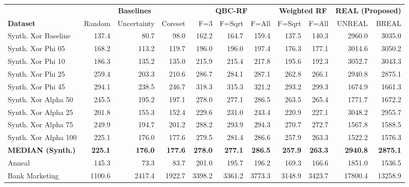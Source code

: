 \begin{table}[htbp]
    \centering
    \scriptsize
    \setlength{\tabcolsep}{4pt}
    \begin{tabular}{l rrrrrrrrrr}
        \toprule
         & \multicolumn{3}{c}{\textbf{Baselines}} & \multicolumn{3}{c}{\textbf{QBC-RF}} & \multicolumn{2}{c}{\textbf{Weighted RF}} & \multicolumn{2}{c}{\textbf{REAL (Proposed)}} \\
         \cmidrule(lr){2-4} \cmidrule(lr){5-7} \cmidrule(lr){8-9} \cmidrule(lr){10-11}
        \textbf{Dataset} & Random & Uncertainty & Coreset & F=3 & F=Sqrt & F=All & F=Sqrt & F=All & UNREAL & BREAL \\ \midrule
        Synth. Xor Baseline & 137.4 & 80.7 & 98.0 & 162.2 & 164.7 & 159.4 & 137.5 & 140.3 & 2960.0 & 3035.0 \\
        Synth. Xor Phi 05 & 168.2 & 113.2 & 119.7 & 196.0 & 196.0 & 197.4 & 176.3 & 177.1 & 3014.6 & 3050.2 \\
        Synth. Xor Phi 10 & 186.3 & 135.2 & 135.0 & 215.9 & 215.4 & 217.8 & 195.6 & 192.3 & 3052.7 & 3043.3 \\
        Synth. Xor Phi 25 & 259.4 & 203.3 & 210.6 & 286.7 & 284.1 & 287.1 & 262.8 & 266.1 & 2940.8 & 2875.1 \\
        Synth. Xor Phi 45 & 294.1 & 238.5 & 246.7 & 318.3 & 315.3 & 321.2 & 293.2 & 299.3 & 1674.9 & 1661.3 \\
        Synth. Xor Alpha 50 & 245.5 & 195.2 & 197.1 & 278.0 & 277.1 & 286.5 & 263.5 & 265.4 & 1771.7 & 1672.2 \\
        Synth. Xor Alpha 25 & 201.8 & 155.3 & 152.4 & 229.6 & 231.0 & 243.4 & 220.9 & 227.1 & 3048.2 & 2955.7 \\
        Synth. Xor Alpha 75 & 249.9 & 194.7 & 201.2 & 288.2 & 293.9 & 294.3 & 270.7 & 272.7 & 1567.8 & 1588.5 \\
        Synth. Xor Alpha 100 & 225.1 & 176.0 & 177.6 & 279.5 & 281.4 & 286.6 & 257.9 & 263.3 & 1522.2 & 1576.3 \\
        \midrule
        \textbf{MEDIAN (Synth.)} & \textbf{225.1} & \textbf{176.0} & \textbf{177.6} & \textbf{278.0} & \textbf{277.1} & \textbf{286.5} & \textbf{257.9} & \textbf{263.3} & \textbf{2940.8} & \textbf{2875.1} \\
        \midrule
        Anneal & 145.3 & 73.3 & 83.7 & 201.0 & 195.7 & 196.2 & 169.3 & 166.6 & 1851.0 & 1536.5 \\
        Bank Marketing & 1100.6 & 2417.4 & 1922.7 & 3398.2 & 3361.2 & 3773.3 & 3148.9 & 3423.7 & 17800.4 & 13258.9 \\

\end{tabular}
\end{table}

